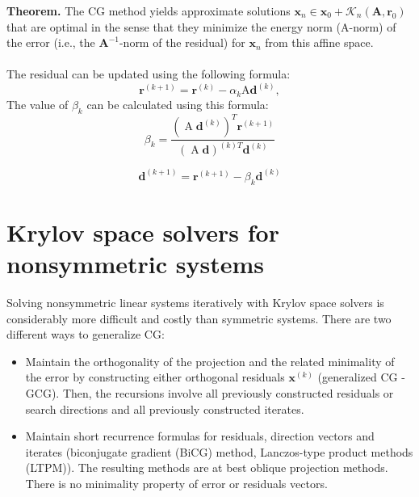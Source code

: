 \documentclass[11pt]{book}
\begin{document}
\textbf{Theorem.} The CG method yields approximate solutions $\mathbf{x}_n \in \mathbf{x}_0+\mathcal{K}_n\left(\mathbf{A}, \mathbf{r}_0\right)$ that are optimal in the sense that they minimize the energy norm (A-norm) of the error (i.e., the $\mathbf{A}^{-1}$-norm of the residual) for $\mathbf{x}_n$ from this affine space.\\ \\ 
The residual can be updated using the following formula:
$$
\mathbf{r}^{(k+1)}=\mathbf{r}^{(k)}-\alpha_{k} \mathrm{A}\mathbf{d}^{(k)},
$$
The value of $\beta_{k}$ can be calculated using this formula:
$$
\beta_{k}=\frac{\left(\operatorname{A}\mathbf{d}^{(k)}\right)^{T} \mathbf{r}^{(k+1)}}{\left(\operatorname{A}\mathbf{d}\right)^{(k)T} \mathbf{d}^{(k)}}
$$

$$
\mathbf{d}^{(k+1)}=\mathbf{r}^{(k+1)}-\beta_{k} \mathbf{d}^{(k)}
$$ 
\section*{Krylov space solvers for nonsymmetric systems}
Solving nonsymmetric linear systems iteratively with Krylov space solvers is considerably more difficult and costly than symmetric systems. There are two different ways to generalize CG:
\begin{itemize}
  \item Maintain the orthogonality of the projection and the related minimality of the error by constructing either orthogonal residuals $\mathbf{x}^{(k)}$ (generalized CG - GCG). Then, the recursions involve all previously constructed residuals or search directions and all previously constructed iterates.\\
  \item Maintain short recurrence formulas for residuals, direction vectors and iterates (biconjugate gradient (BiCG) method, Lanczos-type product methods (LTPM)). The resulting methods are at best oblique projection methods. There is no minimality property of error or residuals vectors.\\
\end{itemize}
\end{document}
